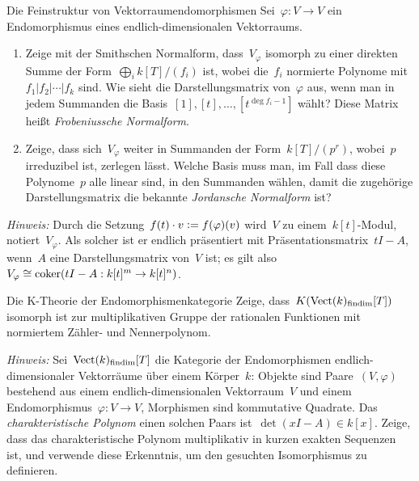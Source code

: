 \documentclass{uebblatt}
\begin{document}
\begin{aufgabe}{Die Feinstruktur von Vektorraumendomorphismen}
Sei~$\varphi : V \to V$ ein Endomorphismus eines endlich-dimensionalen
Vektorraums.
\begin{enumerate}
\item Zeige mit der Smithschen Normalform, dass~$V_\varphi$ isomorph zu einer
direkten Summe der Form~$\bigoplus_i k[T]/(f_i)$ ist, wobei die~$f_i$ normierte
Polynome mit~$f_1 | f_2 | \cdots | f_k$ sind.
Wie sieht die Darstellungsmatrix von~$\varphi$ aus, wenn man in jedem
Summanden die Basis~$[1],[t],\ldots,[t^{\deg f_i - 1}]$ wählt? Diese
Matrix heißt \emph{Frobeniussche Normalform}.
\item Zeige, dass sich~$V_\varphi$ weiter in Summanden der Form~$k[T]/(p^r)$,
wobei~$p$ irreduzibel ist, zerlegen lässt. Welche Basis muss man, im Fall
dass diese Polynome~$p$ alle linear sind, in den Summanden wählen, damit die
zugehörige Darstellungsmatrix die bekannte \emph{Jordansche Normalform} ist?
\end{enumerate}
{\tiny\emph{Hinweis:} Durch die Setzung~$f(t) \cdot v \vcentcolon=
f(\varphi)(v)$ wird~$V$ zu einem~$k[t]$-Modul, notiert~$V_\varphi$. Als solcher
ist er endlich präsentiert mit Präsentationsmatrix~$tI - A$, wenn~$A$ eine
Darstellungsmatrix von~$V$ ist; es gilt also~$V_\varphi \cong \operatorname{coker}(tI - A :
k[t]^m \to k[t]^n)$.\par}
\end{aufgabe}

\begin{aufgabe}{Die K-Theorie der Endomorphismenkategorie}
Zeige, dass~$K(\mathrm{Vect}(k)_\text{findim}[T])$ isomorph ist zur
multiplikativen Gruppe der rationalen Funktionen mit normiertem Zähler- und
Nennerpolynom.

{\tiny\emph{Hinweis:} Sei~$\mathrm{Vect}(k)_\text{findim}[T]$ die Kategorie der
Endomorphismen endlich-dimensionaler Vektorräume über einem Körper~$k$: Objekte
sind Paare~$(V,\varphi)$ bestehend aus einem endlich-dimensionalen
Vektorraum~$V$ und einem Endomorphismus~$\varphi : V \to V$, Morphismen sind
kommutative Quadrate. Das \emph{charakteristische Polynom} einen solchen Paars
ist~$\det(xI-A) \in k[x]$. Zeige, dass das charakteristische Polynom
multiplikativ in kurzen exakten Sequenzen ist, und verwende diese Erkenntnis,
um den gesuchten Isomorphismus zu definieren.\par}
\end{aufgabe}
\end{document}
